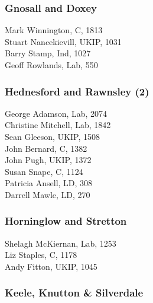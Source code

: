 \documentclass[a4paper,openany,10pt]{book}
\begin{document}
\subsubsection*{Gnosall and Doxey}



Mark Winnington, C, 1813\\
Stuart Nancekievill, UKIP, 1031\\
Barry Stamp, Ind, 1027\\
Geoff Rowlands, Lab, 550\\


\subsubsection*{Hednesford and Rawnsley (2)}



George Adamson, Lab, 2074\\
Christine Mitchell, Lab, 1842\\
Sean Gleeson, UKIP, 1508\\
John Bernard, C, 1382\\
John Pugh, UKIP, 1372\\
Susan Snape, C, 1124\\
Patricia Ansell, LD, 308\\
Darrell Mawle, LD, 270\\


\subsubsection*{Horninglow and Stretton}



Shelagh McKiernan, Lab, 1253\\
Liz Staples, C, 1178\\
Andy Fitton, UKIP, 1045\\


\subsubsection*{Keele, Knutton \& Silverdale}

\end{document}
